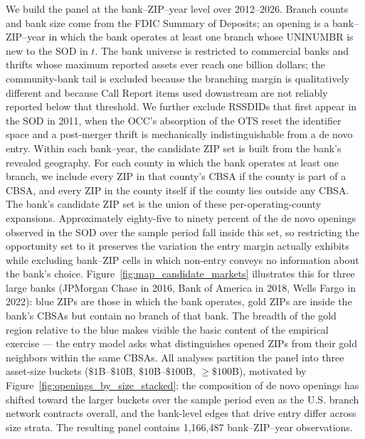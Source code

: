 We build the panel at the bank--ZIP--year level over 2012--2026. Branch counts and bank size come from the FDIC Summary of Deposits; an opening is a bank--ZIP--year in which the bank operates at least one branch whose UNINUMBR is new to the SOD in $t$. The bank universe is restricted to commercial banks and thrifts whose maximum reported assets ever reach one billion dollars; the community-bank tail is excluded because the branching margin is qualitatively different and because Call Report items used downstream are not reliably reported below that threshold. We further exclude RSSDIDs that first appear in the SOD in 2011, when the OCC's absorption of the OTS reset the identifier space and a post-merger thrift is mechanically indistinguishable from a de novo entry. Within each bank--year, the candidate ZIP set is built from the bank's revealed geography. For each county in which the bank operates at least one branch, we include every ZIP in that county's CBSA if the county is part of a CBSA, and every ZIP in the county itself if the county lies outside any CBSA. The bank's candidate ZIP set is the union of these per-operating-county expansions. Approximately eighty-five to ninety percent of the de novo openings observed in the SOD over the sample period fall inside this set, so restricting the opportunity set to it preserves the variation the entry margin actually exhibits while excluding bank--ZIP cells in which non-entry conveys no information about the bank's choice. Figure~\ref{fig:map_candidate_markets} illustrates this for three large banks (JPMorgan Chase in 2016, Bank of America in 2018, Wells Fargo in 2022): blue ZIPs are those in which the bank operates, gold ZIPs are inside the bank's CBSAs but contain no branch of that bank. The breadth of the gold region relative to the blue makes visible the basic content of the empirical exercise --- the entry model asks what distinguishes opened ZIPs from their gold neighbors within the same CBSAs. All analyses partition the panel into three asset-size buckets ($\$1$B--$\$10$B, $\$10$B--$\$100$B, $\geq \$100$B), motivated by Figure~\ref{fig:openings_by_size_stacked}: the composition of de novo openings has shifted toward the larger buckets over the sample period even as the U.S. branch network contracts overall, and the bank-level edges that drive entry differ across size strata. The resulting panel contains 1{,}166{,}487 bank--ZIP--year observations.

